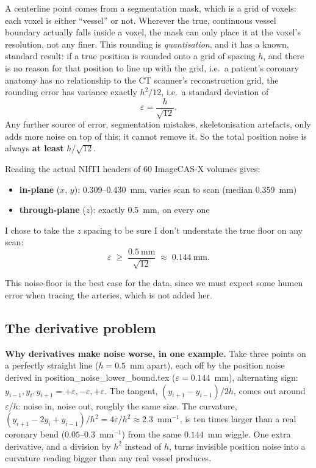 A centerline point comes from a segmentation mask, which is a grid of voxels: each voxel is
either ``vessel'' or not. Wherever the true, continuous vessel boundary actually falls inside a
voxel, the mask can only place it at the voxel's resolution, not any finer. This rounding is
\emph{quantisation}, and it has a known, standard result: if a true position is rounded onto a
grid of spacing $h$, and there is no reason for that position to line up with the grid, i.e.\ a
patient's coronary anatomy has no relationship to the CT scanner's reconstruction grid, the
rounding error has variance exactly $h^2/12$, i.e.\ a standard deviation of
\begin{equation}
  \varepsilon = \frac{h}{\sqrt{12}}.
  \label{eq:week3-quant-floor}
\end{equation}
Any further source of error, segmentation mistakes, skeletonisation artefacts, only adds more
noise on top of this; it cannot remove it. So the total position noise is always
\textbf{at least} $h/\sqrt{12}$.

Reading the actual NIfTI headers of 60 ImageCAS-X volumes gives:
\begin{itemize}
  \item \textbf{in-plane} ($x$, $y$): 0.309--0.430~mm, varies scan to scan (median 0.359~mm)
  \item \textbf{through-plane} ($z$): exactly 0.5~mm, on every one 
\end{itemize}
I chose to take the $z$ spacing to be sure I don't understate the true floor on any scan:
\[
  \varepsilon \;\geq\; \frac{0.5~\text{mm}}{\sqrt{12}} \;\approx\; 0.144~\text{mm}.
\]

This noise-floor is the best case for the data, since we must expect some humen error when tracing the arteries, which is not added her.

\subsection{The derivative problem}


\textbf{Why derivatives make noise worse, in one example.} Take three points on a perfectly
straight line ($h = 0.5$~mm apart), each off by the position noise derived in
position\_noise\_lower\_bound.tex ($\varepsilon = 0.144$~mm), alternating sign:
$y_{i-1}, y_i, y_{i+1} = +\varepsilon, -\varepsilon, +\varepsilon$. The tangent,
$(y_{i+1}-y_{i-1})/2h$, comes out around $\varepsilon/h$: noise in, noise out, roughly the same
size. The curvature, $(y_{i+1} - 2y_i + y_{i-1})/h^2 = 4\varepsilon/h^2 \approx 2.3$~mm$^{-1}$, is
ten times larger than a real coronary bend ($0.05$--$0.3$~mm$^{-1}$) from the same $0.144$~mm
wiggle. One extra derivative, and a division by $h^2$ instead of $h$, turns invisible position
noise into a curvature reading bigger than any real vessel produces.


